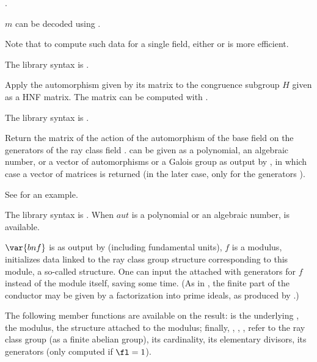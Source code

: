 .

\noindent $m$ can be decoded using .

Note that to compute such data for a single field, either 
or  is more efficient.

The library syntax is .

\label{se:bnrgaloisapply}
Apply the automorphism given by its matrix  to the congruence
subgroup $H$ given as a HNF matrix.
The matrix  can be computed with .

The library syntax is .

\label{se:bnrgaloismatrix}
Return the matrix of the action of the automorphism  of the base
field  on the generators of the ray class field .
 can be given as a polynomial, an algebraic number, or a vector of
automorphisms or a Galois group as output by , in which case a
vector of matrices is returned (in the later case, only for the generators
).

See  for an example.

The library syntax is .
When $aut$ is a polynomial or an algebraic number,
 is available.

\label{se:bnrinit}
$\var{bnf}$ is as
output by  (including fundamental units), $f$ is a modulus,
initializes data linked to the ray class group structure corresponding to
this module, a so-called  structure. One can input the attached
 with generators for $f$ instead of the module itself, saving some
time. (As in , the finite part of the conductor may be given
by a factorization into prime ideals, as produced by .)

The following member functions are available
on the result:  is the underlying ,
 the modulus,  the  structure attached to the
modulus; finally, , , ,  refer to the
ray class group (as a finite abelian group), its cardinality, its elementary
divisors, its generators (only computed if $\fl = 1$).

